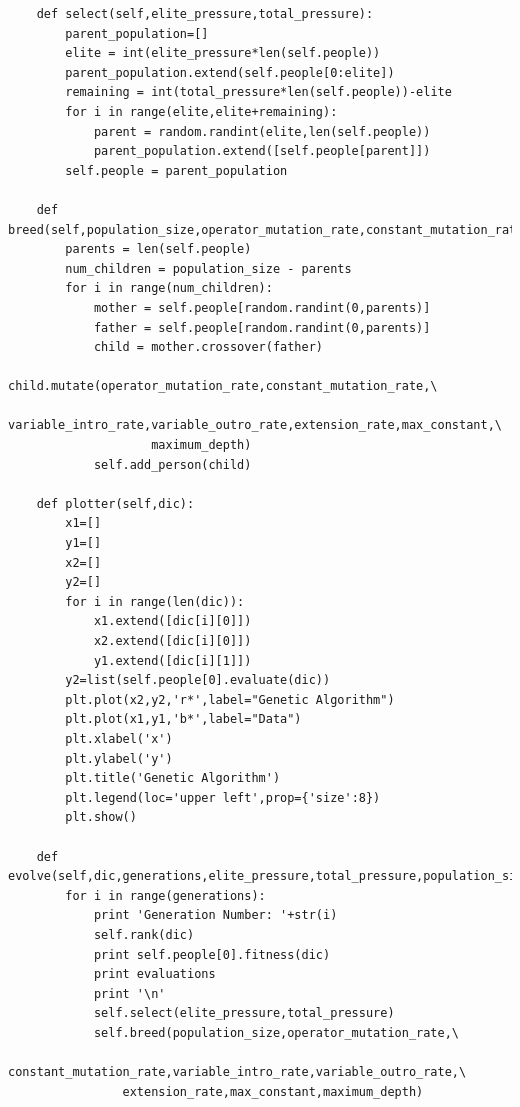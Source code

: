 \documentclass[11pt,amsmath,amssymb]{revtex4}
\begin{document}
\begin{lstlisting}
    def select(self,elite_pressure,total_pressure):
        parent_population=[]
        elite = int(elite_pressure*len(self.people))
        parent_population.extend(self.people[0:elite])
        remaining = int(total_pressure*len(self.people))-elite
        for i in range(elite,elite+remaining):
            parent = random.randint(elite,len(self.people))
            parent_population.extend([self.people[parent]])
        self.people = parent_population

    def breed(self,population_size,operator_mutation_rate,constant_mutation_rate,variable_intro_rate,variable_outro_rate,extension_rate,max_constant,maximum_depth):
        parents = len(self.people)
        num_children = population_size - parents
        for i in range(num_children):
            mother = self.people[random.randint(0,parents)]
            father = self.people[random.randint(0,parents)]
            child = mother.crossover(father)
            child.mutate(operator_mutation_rate,constant_mutation_rate,\
                    variable_intro_rate,variable_outro_rate,extension_rate,max_constant,\
                    maximum_depth)
            self.add_person(child)

    def plotter(self,dic):
        x1=[]
        y1=[]
        x2=[]
        y2=[]
        for i in range(len(dic)):
            x1.extend([dic[i][0]])
            x2.extend([dic[i][0]])
            y1.extend([dic[i][1]])
        y2=list(self.people[0].evaluate(dic))
        plt.plot(x2,y2,'r*',label="Genetic Algorithm")
        plt.plot(x1,y1,'b*',label="Data")
        plt.xlabel('x')
        plt.ylabel('y')
        plt.title('Genetic Algorithm')
        plt.legend(loc='upper left',prop={'size':8})
        plt.show()

    def evolve(self,dic,generations,elite_pressure,total_pressure,population_size,operator_mutation_rate,constant_mutation_rate,variable_intro_rate,variable_outro_rate,extension_rate,max_constant,maximum_depth):
        for i in range(generations):
            print 'Generation Number: '+str(i)
            self.rank(dic)
            print self.people[0].fitness(dic)
            print evaluations
            print '\n'
            self.select(elite_pressure,total_pressure)
            self.breed(population_size,operator_mutation_rate,\
                constant_mutation_rate,variable_intro_rate,variable_outro_rate,\
                extension_rate,max_constant,maximum_depth)
\end{lstlisting}
\end{document}
